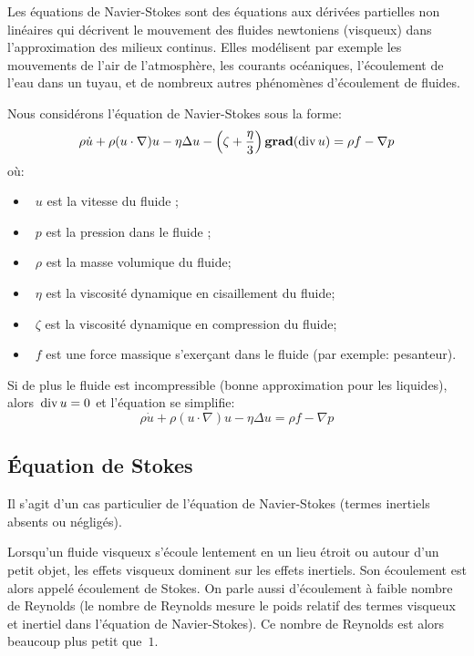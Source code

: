 \medskip
Les équations de Navier-Stokes sont des équations aux dérivées partielles non linéaires qui décrivent le mouvement 
des fluides newtoniens (visqueux) dans l'approximation des milieux continus. 
Elles modélisent par exemple les mouvements de l'air de l'atmosphère, les courants océaniques, 
l'écoulement de l'eau dans un tuyau, et de nombreux autres phénomènes d'écoulement de fluides.

\medskip
Nous considérons l'équation de Navier-Stokes sous la forme:
\begin{equation}
\rho \dot{u} + \rho (u\cdot\nabla)u - \eta \Delta u
- \left( \zeta + \frac{\eta}{3} \right) \operatorname{\mathbf{grad}} (\operatorname{div} u)
= \rho f - \nabla p
\end{equation}
où:
\begin{itemize}
  \item~$u$ est la vitesse du fluide ;
  \item~$p$ est la pression dans le fluide ;
  \item~$\rho$ est la masse volumique du fluide;
  \item~$\eta$ est la viscosité dynamique en cisaillement du fluide;
  \item~$\zeta$ est la viscosité dynamique en compression du fluide;
  \item~$f$ est une force massique s'exerçant dans le fluide (par exemple: pesanteur).
\end{itemize}

\medskip
Si de plus le fluide est incompressible (bonne approximation pour les liquides), alors~$\operatorname{div} u = 0$ 
et l'équation se simplifie:
\begin{equation}
\rho \dot{u} + \rho (u\cdot\nabla)u - \eta \Delta u
= \rho f - \nabla p
\end{equation}



\medskip
\subsection{Équation de Stokes}

Il s'agit d'un cas particulier de l'équation de Navier-Stokes (termes inertiels absents ou négligés).

Lorsqu'un fluide visqueux s'écoule lentement en un lieu étroit ou autour d'un petit objet, 
les effets visqueux dominent sur les effets inertiels. 
Son écoulement est alors appelé écoulement de Stokes.
On parle aussi d'écoulement à faible nombre de Reynolds (le nombre de Reynolds 
mesure le poids relatif des termes visqueux et inertiel dans l'équation de Navier-Stokes). Ce nombre
de Reynolds est alors beaucoup plus petit que~$1$.

